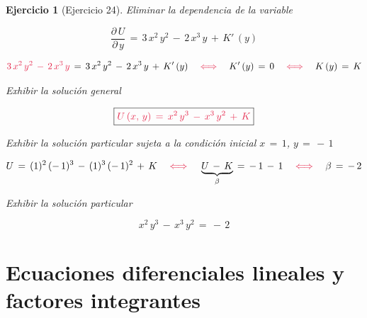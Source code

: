 \documentclass[a4paper,11pt,openany]{book}
\newtheorem{ejer}{Ejercicio}[section]
\begin{document}
\begin{ejer}[Ejercicio 24]
 Eliminar la dependencia de la variable 

$$\dfrac{\partial\,U}{\partial\,y}\,=\,3\,x^{2}\,y^{2}\,-\,2\,x^{3}\,y\,+\,K'\,(y)$$ 

$$\textcolor{amaranth}{3\,x^{2}\,y^{2}\,-\,2\,x^{3}\,y}\,=\,3\,x^{2}\,y^{2}\,-\,2\,x^{3}\,y\,+\,K'\,(y) \quad \textcolor{amaranth}{\iff} \quad K'\,(y)\,=\,0 \quad \textcolor{amaranth}{\iff} \quad K\,(y)\,=\,K$$ 

 Exhibir la solución general 

$$\boxed{\textcolor{amaranth}{U\,(x,\,y)\,=\,x^{2}\,y^{3}\,-\,x^{3}\,y^{2}\,+\,K}} $$ 

 Exhibir la solución particular sujeta a la condición inicial $x\,=\,1$, $y\,=\,-\,1$ 

$$U\,=\,(1)^{2}\,(-\,1)^{3}\,-\,(1)^{3}\,(-\,1)^{2}\,+\,K \quad \textcolor{amaranth}{\iff} \quad \underbrace{U\,-\,K}_{\beta}\,=\,-\,1\,-\,1 \quad \textcolor{amaranth}{\iff} \quad \beta\,=\,-\,2$$ 

 Exhibir la solución particular 

$$\boxed{x^{2}\,y^{3}\,-\,x^{3}\,y^{2}\,=\,-\,2} $$ 

\end{ejer} 

\chapter{Ecuaciones diferenciales lineales y factores integrantes} 
\end{document}
